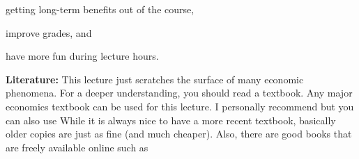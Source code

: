 \begin{itemize}
{	\item getting long-term benefits out of the course, 
	
	\item improve grades, and 
	
	\item have more fun during lecture hours.
	
}
	\pbn
	
	\item \textbf{Literature:}
This lecture just scratches the surface of many economic phenomena. For a deeper
understanding, you should read a textbook. Any major economics textbook can be used
for this lecture. I personally recommend 
		but you can also use 
	While it is always nice to have a more recent textbook, basically older copies are just as fine (and much cheaper). Also, there are good books that are freely available online such as 



\end{itemize}
